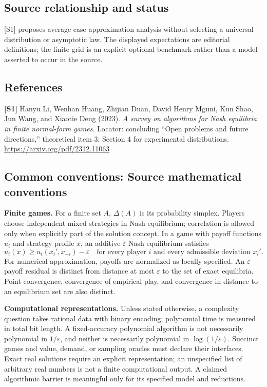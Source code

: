 \documentclass[11pt,a4paper]{article}
\begin{document}
\subsection*{Source relationship and status}
[S1] proposes average-case approximation analysis without selecting a universal distribution or asymptotic law. The displayed expectations are editorial definitions; the finite grid is an explicit optional benchmark rather than a model asserted to occur in the source.
\subsection*{References}
\begingroup\footnotesize\raggedright
{\footnotesize\raggedright
\textbf{[S1]} Hanyu Li, Wenhan Huang, Zhijian Duan, David Henry Mguni, Kun Shao, Jun Wang, and Xiaotie Deng (2023). \emph{A survey on algorithms for Nash equilibria in finite normal-form games}. Locator: concluding ``Open problems and future directions,'' theoretical item 3; Section 4 for experimental distributions. \url{https://arxiv.org/pdf/2312.11063}\par}
\par\endgroup

\subsection*{Common conventions: Source mathematical conventions}

\textbf{Finite games.} For a finite set $A$, $\Delta(A)$ is its probability
simplex. Players choose independent mixed strategies in Nash equilibrium;
correlation is allowed only when explicitly part of the solution concept.
In a game with payoff functions $u_i$ and strategy profile $x$, an additive
$\varepsilon$ Nash equilibrium satisfies
\[
 u_i(x)\geq u_i(x_i',x_{-i})-\varepsilon
 \quad\text{for every player $i$ and every admissible deviation $x_i'$}.
\]
For numerical approximation, payoffs are normalized as locally specified.
An $\varepsilon$ payoff residual is distinct from distance at most
$\varepsilon$ to the set of exact equilibria. Point convergence, convergence
of empirical play, and convergence in distance to an equilibrium set are
also distinct.

\textbf{Computational representations.} Unless stated otherwise, a complexity
question takes rational data with binary encoding; polynomial time is measured
in total bit length. A fixed-accuracy polynomial algorithm is not necessarily
polynomial in $1/\varepsilon$, and neither is necessarily polynomial in
$\log(1/\varepsilon)$. Succinct games and value, demand, or sampling oracles
must declare their interfaces. Exact real solutions require an explicit
representation; an unspecified list of arbitrary real numbers is not a
finite computational output. A claimed algorithmic barrier is meaningful
only for its specified model and reductions.
\end{document}
